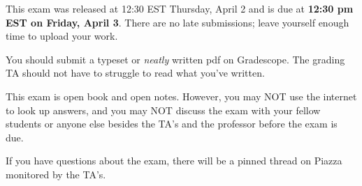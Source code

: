 \documentclass[11pt]{article}
\begin{document}

This exam was released at 12:30 EST Thursday, April 2 and is due at \textbf{12:30 pm EST on Friday, April 3}. There are no late submissions; leave yourself enough time to upload your work.

You should submit a typeset or \emph{neatly} written pdf on Gradescope.  The grading TA should not have to struggle to read what you've written.

This exam is open book and open notes. However, you may NOT use the internet to look up answers, and you may NOT discuss the exam with your fellow students or anyone else besides the TA's and the professor before the exam is due.

If you have questions about the exam, there will be a pinned thread on Piazza monitored by the TA's.
\end{document}

